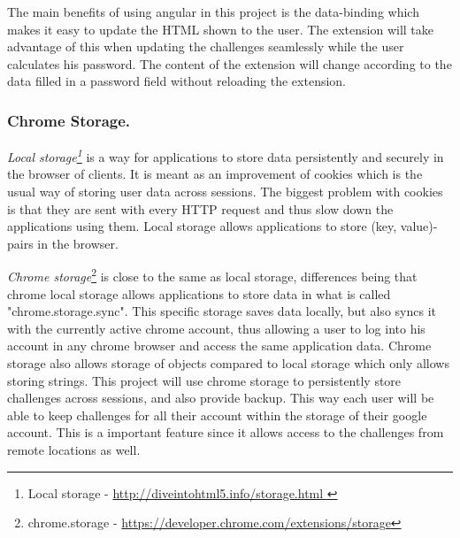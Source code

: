 \par The main benefits of using angular in this project is the data-binding which makes it easy to update the HTML shown to the user. The extension will take advantage of this when updating the challenges seamlessly while the user calculates his password. The content of the extension will change according to the data filled in a password field without reloading the extension. 

\subsubsection{Chrome Storage.}\label{chrome-storage}
\emph{Local storage\footnote{Local storage - \url{ http://diveintohtml5.info/storage.html }}} is a way for applications to store data persistently and securely in the browser of clients. It is meant as an improvement of cookies which is the usual way of storing user data across sessions. The biggest problem with cookies is that they are sent with every HTTP request and thus slow down the applications using them. Local storage allows applications to store (key, value)-pairs in the browser. 
\par \emph{Chrome storage}\footnote{chrome.storage - \url{https://developer.chrome.com/extensions/storage}} is close to the same as local storage, differences being that chrome local storage allows applications to store data in what is called "chrome.storage.sync". This specific storage saves data locally, but also syncs it with the currently active chrome account, thus allowing a user to log into his account in any chrome browser and access the same application data. Chrome storage also allows storage of objects compared to local storage which only allows storing strings. This project will use chrome storage to persistently store challenges across sessions, and also provide backup. This way each user will be able to keep challenges for all their account within the storage of their google account. This is a important feature since it allows access to the challenges from remote locations as well.

